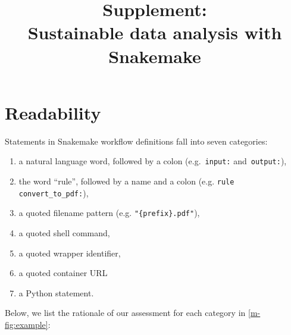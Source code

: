 \documentclass{scrartcl}
\begin{document}
\title{Supplement:\\
Sustainable data analysis with Snakemake}
\maketitle


\section{Readability}
\label{sec:readability}

Statements in Snakemake workflow definitions fall into seven categories:
\begin{enumerate}
	\item a natural language word, followed by a colon (e.g.~\lstinline!input:! and~\lstinline!output:!),
	\item the word ``rule'', followed by a name and a colon (e.g. \lstinline!rule convert_to_pdf:!),
	\item a quoted filename pattern (e.g. \lstinline!"{prefix}.pdf"!),
	\item a quoted shell command,
	\item a quoted wrapper identifier,
	\item a quoted container URL
	\item a Python statement.
\end{enumerate}

Below, we list the rationale of our assessment for each category in \autoref{m-fig:example}:
\end{document}
